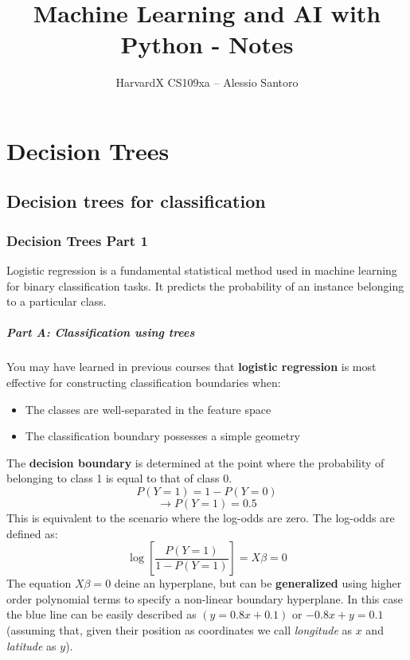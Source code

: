 \documentclass[11pt,a4paper]{report}
\author{HarvardX CS109xa -- Alessio Santoro}
\title{Machine Learning and AI with Python - Notes}
\begin{document}
\maketitle
\chapter{Decision Trees}
\section{Decision trees for classification}
\subsection{Decision Trees Part 1}

Logistic regression is a fundamental statistical method used in machine learning for binary classification tasks. It predicts the probability of an instance belonging to a particular class.

\paragraph{Part A: Classification using trees}
You may have learned in previous courses that \textbf{logistic regression} is most effective for constructing classification boundaries when:
\begin{itemize}
	\item The classes are well-separated in the feature space
	\item The classification boundary possesses a simple geometry
\end{itemize}
The \textbf{decision boundary} is determined at the point where the probability of belonging to class 1 is equal to that of class 0.
$$P(Y=1)=1-P(Y=0)$$
$$\rightarrow P(Y=1)=0.5$$
This is equivalent to the scenario where the log-odds are zero. The log-odds are defined as:  
$$\log\left[\frac{P(Y=1)}{1-P(Y=1)}\right]=X\beta=0$$
The equation $X\beta=0$ deine an hyperplane, but can be \textbf{generalized} using higher order polynomial terms to specify a non-linear boundary hyperplane. 
In this case the blue line can be easily described as $(y=0.8x+0.1)$ or $-0.8x+y=0.1$ (assuming that, given their position as coordinates we call \textit{longitude} as $x$ and \textit{latitude} as $y$).\\\\
\end{document}
